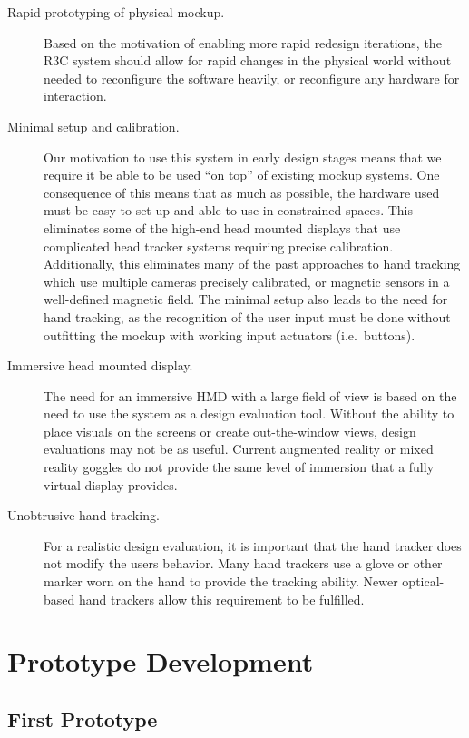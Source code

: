 \begin{description}
    \item [Rapid prototyping of physical mockup.]
        Based on the motivation of enabling more rapid redesign iterations, the R3C system should allow for rapid changes in the physical world without needed to reconfigure the software heavily, or reconfigure any hardware for interaction.
    \item [Minimal setup and calibration.]
        Our motivation to use this system in early design stages means that we require it be able to be used ``on top'' of existing mockup systems.
        One consequence of this means that as much as possible, the hardware used must be easy to set up and able to use in constrained spaces.
        This eliminates some of the high-end head mounted displays that use complicated head tracker systems requiring precise calibration.
        Additionally, this eliminates many of the past approaches to hand tracking which use multiple cameras precisely calibrated, or magnetic sensors in a well-defined magnetic field.
        The minimal setup also leads to the need for hand tracking, as the recognition of the user input must be done without outfitting the mockup with working input actuators (i.e.\ buttons).
    \item [Immersive head mounted display.]
        The need for an immersive HMD with a large field of view is based on the need to use the system as a design evaluation tool.
        Without the ability to place visuals on the screens or create out-the-window views, design evaluations may not be as useful.
        Current augmented reality or mixed reality goggles do not provide the same level of immersion that a fully virtual display provides.
    \item [Unobtrusive hand tracking.]
        For a realistic design evaluation, it is important that the hand tracker does not modify the users behavior.
        Many hand trackers use a glove or other marker worn on the hand to provide the tracking ability.
        Newer optical-based hand trackers allow this requirement to be fulfilled.
\end{description}

\section{Prototype Development}

\subsection{First Prototype}


